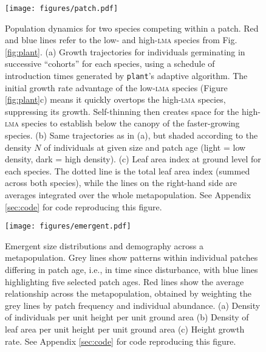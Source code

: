 \documentclass[a4paper,11pt]{article}
\newcommand{\plant}{\texttt{plant}}
\begin{document}
\newpage

\begin{figure}[h!]
\centering
\texttt{[image: figures/patch.pdf]}
\caption{Population dynamics for two species competing within a patch.
 Red and blue lines refer to the low- and high-\textsc{lma} species from
 Fig. \ref{fig:plant}. (a) Growth trajectories
 for individuals germinating in successive ``cohorts'' for each
 species, using a schedule of introduction times generated by
 {\plant}'s adaptive algorithm. The initial growth rate advantage of
 the low-\textsc{lma} species (Figure \ref{fig:plant}c) means it
 quickly overtops the high-\textsc{lma} species, suppressing its
 growth. Self-thinning then creates space for the high-\textsc{lma}
 species to establish below the canopy of the faster-growing species.
 (b) Same trajectories as in (a), but shaded
 according to the density $N$ of individuals at given size and patch
 age (light = low density, dark = high density). (c) Leaf area
 index at ground level for each species. The dotted line is the
 total leaf area index (summed across both species), while the lines on
 the right-hand side are averages integrated over the whole
 metapopulation. See Appendix \ref{sec:code} for code
 reproducing this figure.}
\label{fig:patch}
\end{figure}

\newpage

\begin{figure}[h!]
\centering
\texttt{[image: figures/emergent.pdf]}
\caption{Emergent size distributions and demography across a metapopulation.
Grey lines show patterns within individual patches differing in patch age, i.e., in time
since disturbance, with blue lines highlighting five selected
patch ages. Red lines show the average relationship across the metapopulation,
obtained by weighting the grey lines by patch frequency and individual abundance.
(a) Density of individuals per unit height per unit ground area (b) Density of leaf area
per unit height per unit ground area (c) Height growth rate.
See Appendix \ref{sec:code} for code reproducing this figure.}
\label{fig:emergent}
\end{figure}

\newpage
\end{document}

